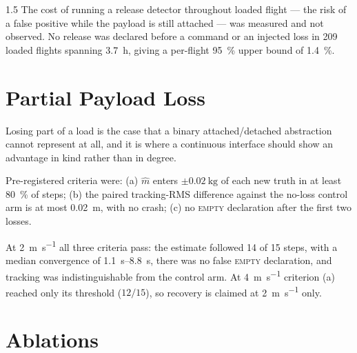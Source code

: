 \begin{spacing}{1.5}
The cost of running a release detector throughout loaded flight --- the risk of a
false positive while the payload is still attached --- was measured and not
observed. No release was declared before a command or an injected loss in 209
loaded flights spanning \SI{3.7}{\hour}, giving a per-flight \SI{95}{\percent}
upper bound of \SI{1.4}{\percent}.

\section{Partial Payload Loss}\label{sec:eval:partial}

Losing part of a load is the case that a binary attached/detached abstraction
cannot represent at all, and it is where a continuous interface should show an
advantage in kind rather than in degree.

Pre-registered criteria were: (a) $\hat m$ enters $\pm\SI{0.02}{\kg}$ of each new
truth in at least \SI{80}{\percent} of steps; (b) the paired tracking-RMS
difference against the no-loss control arm is at most \SI{0.02}{\meter}, with no
crash; (c) no \textsc{empty} declaration after the first two losses.

At \SI{2}{\meter\per\second} all three criteria pass: the estimate followed 14 of
15 steps, with a median convergence of \SIrange{1.1}{8.8}{\second}, there was no
false \textsc{empty} declaration, and tracking was indistinguishable from the
control arm. At \SI{4}{\meter\per\second} criterion (a) reached only its
threshold ($12/15$), so recovery is claimed at \SI{2}{\meter\per\second} only.

\section{Ablations}\label{sec:eval:ablations}


\end{spacing}
